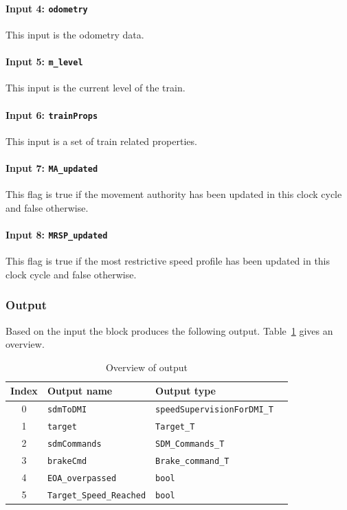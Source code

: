 \paragraph{Input 4: \texttt{odometry}}
This input is the odometry data.
\paragraph{Input 5: \texttt{m\_level}}
This input is the current level of the train.
\paragraph{Input 6: \texttt{trainProps}}
This input is a set of train related properties.
\paragraph{Input 7: \texttt{MA\_updated}}
This flag is true if the movement authority has been updated in this clock cycle and false otherwise.
\paragraph{Input 8: \texttt{MRSP\_updated}}
This flag is true if the most restrictive speed profile has been updated in this clock cycle and false otherwise.



\subsubsection{Output}
Based on the input the block produces the following output. Table~\ref{tbl:speedsupervisionOutput} gives an overview.

\begin{table}[H]
  \begin{tabular}{| c | l | l | l |}
    \hline
    \textbf{Index} & \textbf{Output name} & \textbf{Output type}\\ \hline
    0 & \texttt{sdmToDMI} & \texttt{speedSupervisionForDMI\_T}\\
    1 & \texttt{target} & \texttt{Target\_T}\\
    2 & \texttt{sdmCommands} & \texttt{SDM\_Commands\_T}\\
    3 & \texttt{brakeCmd} & \texttt{Brake\_command\_T}\\
    4 & \texttt{EOA\_overpassed} & \texttt{bool}\\
    5 & \texttt{Target\_Speed\_Reached} & \texttt{bool}\\
    \hline
  \end{tabular} 
  \caption{Overview of output}
  \label{tbl:speedsupervisionOutput}
\end{table}

